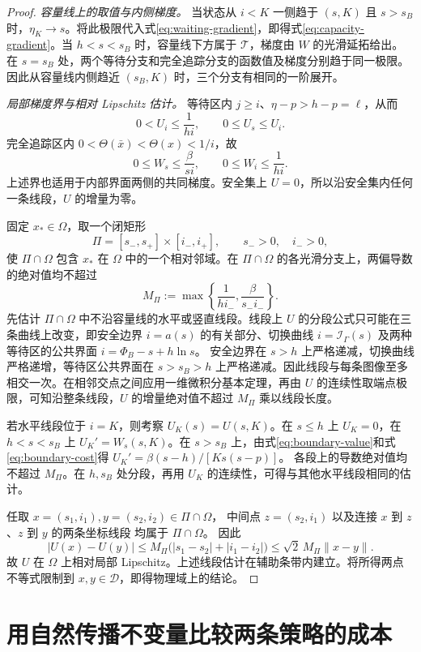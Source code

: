 \documentclass[lang=cn,a4paper,newtx]{elegantpaper}
\theoremstyle{plain}
\theoremstyle{definition}
\newcommand{\Dcal}{\mathcal D}
\begin{document}
\begin{proof}
\emph{容量线上的取值与内侧梯度。}
当状态从 $i<K$ 一侧趋于 $(s,K)$ 且 $s>s_B$ 时，$\eta_K\to s$。将此极限代入式\eqref{eq:waiting-gradient}，即得式\eqref{eq:capacity-gradient}。当 $h<s<s_B$ 时，容量线下方属于 $\mathcal T$，梯度由 $W$ 的光滑延拓给出。
在 $s=s_B$ 处，两个等待分支和完全追踪分支的函数值及梯度分别趋于同一极限。因此从容量线内侧趋近 $(s_B,K)$ 时，三个分支有相同的一阶展开。

\emph{局部梯度界与相对 Lipschitz 估计。}
等待区内 $j\ge i$、$\eta-p>h-p=\ell$，从而
\[
0<U_i\le\frac{1}{hi},\qquad 0\le U_s\le U_i.
\]
完全追踪区内 $0<\Theta(\bar x)<\Theta(x)<1/i$，故
\[
0\le W_s\le\frac{\beta}{si},\qquad 0\le W_i\le\frac{1}{hi}.
\]
上述界也适用于内部界面两侧的共同梯度。安全集上 $U=0$，所以沿安全集内任何一条线段，$U$ 的增量为零。

固定 $x_*\in\Omega$，取一个闭矩形
\[
\Pi=[s_-,s_+]\times[i_-,i_+],\qquad s_->0,\quad i_->0,
\]
使 $\Pi\cap\Omega$ 包含 $x_*$ 在 $\Omega$ 中的一个相对邻域。在 $\Pi\cap\Omega$ 的各光滑分支上，两偏导数的绝对值均不超过
\[
M_\Pi:=\max\left\{\frac{1}{hi_-},\frac{\beta}{s_-i_-}\right\}.
\]
先估计 $\Pi\cap\Omega$ 中不沿容量线的水平或竖直线段。线段上 $U$ 的分段公式只可能在三条曲线上改变，即安全边界 $i=a(s)$ 的有关部分、切换曲线 $i=\mathcal I_\Gamma(s)$ 及两种等待区的公共界面 $i=\Phi_B-s+h\ln s$。
安全边界在 $s>h$ 上严格递减，切换曲线严格递增，等待区公共界面在 $s>s_B>h$ 上严格递减。因此线段与每条图像至多相交一次。在相邻交点之间应用一维微积分基本定理，再由 $U$ 的连续性取端点极限，可知沿整条线段，$U$ 的增量绝对值不超过 $M_\Pi$ 乘以线段长度。

若水平线段位于 $i=K$，则考察 $U_K(s)=U(s,K)$。在 $s\le h$ 上 $U_K=0$，在 $h<s<s_B$ 上 $U_K'=W_s(s,K)$。在 $s>s_B$ 上，由式\eqref{eq:boundary-value}和式\eqref{eq:boundary-cost}得 $U_K'=\beta(s-h)/[Ks(s-p)]$。
各段上的导数绝对值均不超过 $M_\Pi$。在 $h,s_B$ 处分段，再用 $U_K$ 的连续性，可得与其他水平线段相同的估计。

任取 $x=(s_1,i_1),y=(s_2,i_2)\in \Pi\cap\Omega$，
中间点 $z=(s_2,i_1)$ 以及连接 $x$ 到 $z$、$z$ 到 $y$ 的两条坐标线段
均属于 $\Pi\cap\Omega$。
因此
\[
|U(x)-U(y)|
\le M_\Pi\bigl(|s_1-s_2|+|i_1-i_2|\bigr)
\le\sqrt{2}\,M_\Pi\lVert x-y\rVert.
\]
故 $U$ 在 $\Omega$ 上相对局部 Lipschitz。上述线段估计在辅助条带内建立。将所得两点不等式限制到 $x,y\in\Dcal$，即得物理域上的结论。

\end{proof}

\section{用自然传播不变量比较两条策略的成本}
\label{app:green-mechanism}
\end{document}
